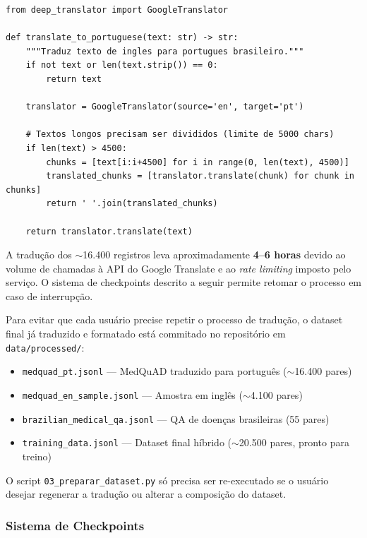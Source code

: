 \begin{lstlisting}[caption={Função de tradução com tratamento de textos longos}, label={lst:traducao}]
from deep_translator import GoogleTranslator

def translate_to_portuguese(text: str) -> str:
    """Traduz texto de ingles para portugues brasileiro."""
    if not text or len(text.strip()) == 0:
        return text

    translator = GoogleTranslator(source='en', target='pt')

    # Textos longos precisam ser divididos (limite de 5000 chars)
    if len(text) > 4500:
        chunks = [text[i:i+4500] for i in range(0, len(text), 4500)]
        translated_chunks = [translator.translate(chunk) for chunk in chunks]
        return ' '.join(translated_chunks)

    return translator.translate(text)
\end{lstlisting}

A tradução dos $\sim$16.400 registros leva aproximadamente \textbf{4--6 horas} devido ao volume de chamadas à API do Google Translate e ao \textit{rate limiting} imposto pelo serviço. O sistema de checkpoints descrito a seguir permite retomar o processo em caso de interrupção.

\begin{infobox}
Para evitar que cada usuário precise repetir o processo de tradução, o dataset final já traduzido e formatado está commitado no repositório em \texttt{data/processed/}:
\begin{itemize}
    \item \texttt{medquad\_pt.jsonl} --- MedQuAD traduzido para português ($\sim$16.400 pares)
    \item \texttt{medquad\_en\_sample.jsonl} --- Amostra em inglês ($\sim$4.100 pares)
    \item \texttt{brazilian\_medical\_qa.jsonl} --- QA de doenças brasileiras (55 pares)
    \item \texttt{training\_data.jsonl} --- Dataset final híbrido ($\sim$20.500 pares, pronto para treino)
\end{itemize}
O script \texttt{03\_preparar\_dataset.py} só precisa ser re-executado se o usuário desejar regenerar a tradução ou alterar a composição do dataset.
\end{infobox}

\subsubsection{Sistema de Checkpoints}

